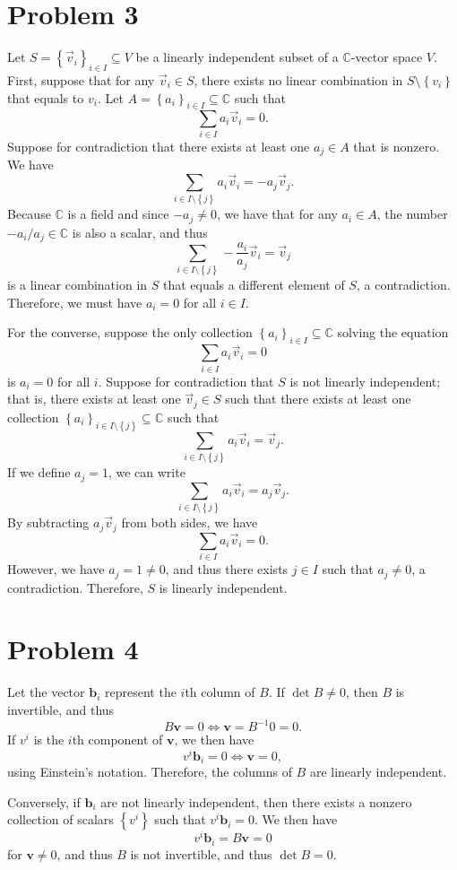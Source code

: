 \documentclass[11pt, letterpaper]{article}
\begin{document}
\section*{Problem 3}
Let $S=\left\{ \vec{v}_{i} \right\}_{i\in I} \subseteq V$ be a linearly independent subset of a $\mathbb{C} $-vector space $V$. First, suppose that for any $\vec{v}_i\in S$, there exists no linear combination in $S\setminus \left\{ v_i \right\} $ that equals to $v_i$. Let $A=\left\{ a_i \right\}_{i\in I} \subseteq \mathbb{C} $ such that
\[
	\sum_{i\in I} a_i \vec{v} _i=0
.\]
Suppose for contradiction that there exists at least one $a_j\in A$ that is nonzero. We have
\[
	\sum_{i\in I\setminus \left\{ j \right\} } a_i \vec{v} _i=-a_j \vec{v}_j
.\]
Because $\mathbb{C} $ is a field and since $-a_j\neq 0$, we have that for any $a_i\in A$, the number $-a_i/a_j\in\mathbb{C} $ is also a scalar, and thus
\[
	\sum_{i\in I\setminus \left\{ j \right\} } -\frac{a_i}{a_j} \vec{v} _i=\vec{v} _j
\]
is a linear combination in $S$ that equals a different element of $S$, a contradiction. Therefore, we must have $a_i=0$ for all $i\in I$.

For the converse, suppose the only collection $\left\{ a_i \right\}_{i\in I} \subseteq \mathbb{C} $ solving the equation
\[
	\sum_{i\in I} a_i \vec{v} _i=0
\]
is $a_i=0$ for all $i$. Suppose for contradiction that $S$ is not linearly independent; that is, there exists at least one $\vec{v} _j\in S$ such that there exists at least one collection $\left\{ a_i \right\}_{i\in I\setminus \left\{ j \right\} } \subseteq \mathbb{C} $ such that
\[
	\sum_{i\in I\setminus \left\{ j \right\} } a_i \vec{v} _i=\vec{v} _j
.\]
If we define $a_j=1$, we can write
\[
	\sum_{i\in I\setminus \left\{ j \right\} } a_i \vec{v} _i=a_j\vec{v} _j
.\]
By subtracting $a_j \vec{v} _j$ from both sides, we have
\[
	\sum_{i\in I} a_i \vec{v} _i=0
.\]
However, we have $a_j=1\neq 0$, and thus there exists $j\in I$ such that $a_j\neq 0$, a contradiction. Therefore, $S$ is linearly independent.
\section*{Problem 4}
Let the vector $\mathbf{b}_i$ represent the $i$th column of $B$. If $\det B\neq 0$, then $B$ is invertible, and thus
\[
	B \mathbf{v} =0 \iff \mathbf{v} =B^{-1} 0=0
.\]
If $v^i$ is the $i$th component of $\mathbf{v} $, we then have
\[
	v^i \mathbf{b}_i=0 \iff \mathbf{v} =0,
\]
using Einstein's notation. Therefore, the columns of $B$ are linearly independent.

Conversely, if $\mathbf{b} _i$ are not linearly independent, then there exists a nonzero collection of scalars $\left\{ v^i \right\} $ such that $v^i \mathbf{b} _i =0$. We then have
\[
	v^i \mathbf{b}_i = B \mathbf{v} =0
\]
for $\mathbf{v} \neq 0$, and thus $B$ is not invertible, and thus $\det B=0$.
\end{document}
